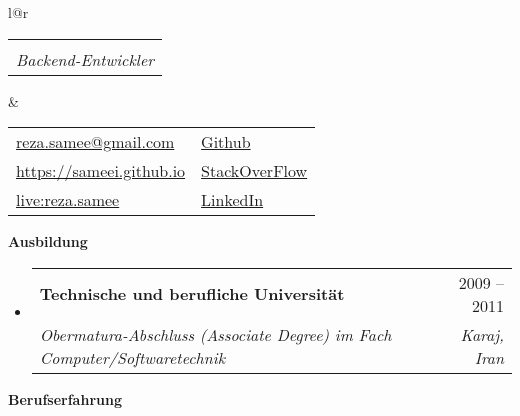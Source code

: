 \documentclass[letterpaper,12pt]{article}[leftmargin=*]
\makeatletter
\def \fullname {Reza Sameei}
\def \subtitle {Backend-Entwickler}
\def \linkedinicon {\faLinkedin}
\def \linkedinlink {http://linkedin.com/in/reza-sameei/}
\def \linkedintext {LinkedIn}
\def \phoneicon {\faPhone}
\def \phonetext {+98-912-666-2695}
\def \skypeicon {\faSkype}
\def \skypelink {https://join.skype.com/invite/nINGOAMPxZdX}
\def \skypename {live:reza.samee}
\def \emailicon {\faEnvelope}
\def \emaillink {mailto:reza.samee@gmail.com}
\def \emailtext {reza.samee@gmail.com}
\def \githubicon {\faGithub}
\def \githublink {https://github.com/sameei}
\def \githubtext {Github}
\def \stacksiteicon {\faStackOverflow}
\def \stacksitelink {https://stackoverflow.com/users/998642/reza-sameei}
\def \stacksitetext {StackOverFlow}
\def \websiteicon {\faGlobe}
\def \websitelink {https://sameei.github.io/}
\def \websitetext {https://sameei.github.io}
\def \headertype {\doublecol} %
\def \entryspacing {-0pt}
\def \linkedin {\linkedinicon \hspace{3pt}\href{\linkedinlink}{\linkedintext}}
\def \phone {\phoneicon \hspace{3pt}{ \phonetext}}
\def \skype {\skypeicon \hspace{3pt}\href{\skypelink}{\skypename}}
\def \email {\emailicon \hspace{3pt}\href{\emaillink}{\emailtext}}
\def \github {\githubicon \hspace{3pt}\href{\githublink}{\githubtext}}
\def \stackoverflow {\stacksiteicon \hspace{3pt}\href{\stacksitelink}{\stacksitetext}}
\def \website {\websiteicon \hspace{3pt}\href{\websitelink}{\websitetext}}
\renewcommand{\section}[2]{\vspace{5pt}
  \colorbox{secondary}{\color{white}\raggedbottom\normalsize\textbf{{#1}{\hspace{7pt}#2}}}
}
\newcommand{\resumeEntryStart}{\begin{itemize}[leftmargin=2.5mm]}
\newcommand{\resumeEntryEnd}{\end{itemize}\vspace{\entryspacing}}
\newcommand{\resumeEntryTSDL}[4]{
  \vspace{-1pt}\item[]
    \begin{tabular*}{0.97\textwidth}{l@{\extracolsep{\fill}}r}
      \textbf{\color{primary}#1} & {\firabook\color{accent}\small#2} \\
      \textit{\color{accent}\small#3} & \textit{\color{accent}\small#4} \\
    \end{tabular*}\vspace{-6pt}
}
\newcommand{\resumeEntryS}[2]{
  \item[]\small{
    \textbf{\color{primary}#1 }{ #2 \vspace{-6pt}}
  }
}
\newcommand{\doublecol}[6]{
  \begin{tabular*}{\textwidth}{l@{\extracolsep{\fill}}r}
    {
      \begin{tabular}[c]{l}
        \fontsize{35}{45}\selectfont{\color{primary}{{\textbf{\fullname}}}}
		\\
        {\textit{\subtitle}} %
      \end{tabular}
    } & {
      \begin{tabular}[c]{l@{\hspace{1.5em}}l}
        {\small#4} & {\small#1} \\
        {\small#5} & {\small#2} \\
        {\small#6} & {\small#3}
      \end{tabular}
    }
  \end{tabular*}
}
\newcommand{\singlecol}[6]{
  \begin{tabular*}{\textwidth}{l@{\extracolsep{\fill}}r}
    {
      \begin{tabular}[b]{l}
        \fontsize{35}{45}\selectfont{\color{primary}{{\textbf{\fullname}}}} \\
        {\textit{\subtitle}} %
      \end{tabular}
    } & {
      \begin{tabular}[c]{l}
        {\small#1} \\
        {\small#2} \\
        {\small#3} \\
        {\small#4} \\
        {\small#5} \\
        {\small#6}
      \end{tabular}
    }
  \end{tabular*}
}
\makeatother
\begin{document}


\headertype{\github}{\stackoverflow}{\linkedin}{\email}{\website}{\skype}{} %





\section{\faGraduationCap}{Ausbildung}

  \resumeEntryStart
    \resumeEntryTSDL
      {Technische und berufliche Universität}{2009 -- 2011}
      {Obermatura-Abschluss (Associate Degree) im Fach Computer/Softwaretechnik}{Karaj, Iran}
  \resumeEntryEnd

 \section{\faBicycle}{Berufserfahrung}
\end{document}
